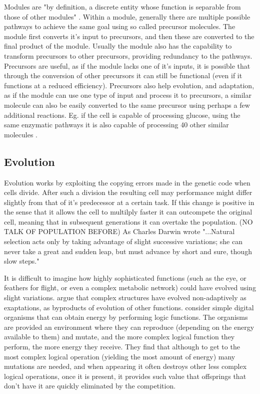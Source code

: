 \documentclass[10pt,a4paper]{article}
\begin{document}
	Modules are "by definition, a discrete entity whose function is separable from those of other modules" \cite{modulardef}. Within a module, generally there are multiple possible pathways to achieve the same goal using so called precursor molecules. The module first converts it's input to precursors, and then these are converted to the final product of the module. Usually the module also has the capability to transform precursors to other precursors, providing redundancy to the pathways. Precursors are useful, as if the module lacks one of it's inputs, it is possible that through the conversion of other precursors it can still be functional (even if it functions at a reduced efficiency). Precursors also help evolution, and adaptation, as if the module can use one type of input and process it to precursors, a similar molecule can also be easily converted to the same precursor using perhaps a few additional reactions. Eg. if the cell is capable of processing glucose, using the same enzymatic pathways it is also capable of processing 40 other similar molecules \cite{latent}.
	
	
	
	\subsection{Evolution}\label{chap:evolution}
	
	Evolution works by exploiting the copying errors made in the genetic code when cells divide. After such a division the resulting cell may performance might differ slightly from that of it's predecessor at a certain task. If this change is positive in the sense that it allows the cell to multilply faster it can outcompete the original cell, meaning that in subsequent generations it can overtake the population. (NO TALK OF POPULATION BEFORE) As Charles Darwin wrote "...Natural selection acts only by taking advantage of slight successive variations; she can never take a great and sudden leap, but must advance by short and sure, though slow steps." \cite{darwin} 
	
	It is difficult to imagine how highly sophisticated functions (such as the eye, or feathers for flight, or even a complex metabolic network) could have evolved using slight variations. \cite{latent} argue that complex structures have evolved non-adaptively as exaptations, as byproducts of evolution of other functions. \cite{complexfeatures}  consider simple digital organisms that can obtain energy by performing logic functions. The organisms are provided an environment where they can reproduce (depending on the energy available to them) and mutate, and the more complex logical function they perform, the more energy they receive. They find that although to get to the most complex logical operation (yielding the most amount of energy) many mutations are needed, and when appearing it often destroys other less complex logical operations, once it is present, it provides such value that offsprings that don't have it are quickly eliminated by the competition.
	
\end{document}
